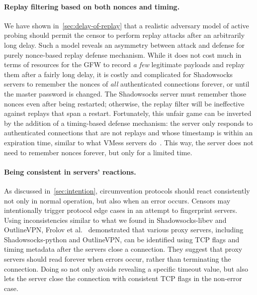 \documentclass[sigconf,letterpaper]{acmart}
\begin{document}
\paragraph{Replay filtering based on both nonces and timing.}
We have shown in~\autoref{sec:delay-of-replay}
that a realistic adversary model of active probing should permit
the censor to perform replay attacks after an arbitrarily long delay.
Such a model reveals an asymmetry between attack and defense
for purely nonce-based replay defense mechanism.
While it does not cost much in terms of resources for the GFW to record \emph{a few} legitimate payloads and replay them after a fairly long delay,
it is costly and complicated for Shadowsocks servers to remember the nonces of \emph{all} authenticated connections forever,
or until the master password is changed.
The Shadowsocks server must remember those nonces even after being restarted;
otherwise, the replay filter will be ineffective against replays that span a restart.
Fortunately,
this unfair game can be inverted by the addition of a timing-based defense mechanism:
the server only responds to authenticated connections that are not replays
and whose timestamp is within an expiration time,
similar to what VMess servers do~\cite{v2ray-replay-summary}.
This way,
the server does not need to remember nonces forever,
but only for a limited time.


\paragraph{Being consistent in servers' reactions.}

As discussed in~\autoref{sec:intention},
circumvention protocols should react consistently not only in normal operation,
but also when an error occurs.
Censors may intentionally trigger protocol edge cases in an attempt to fingerprint servers.
Using inconsistencies similar to what we found in Shadowsocks-libev and OutlineVPN,
Frolov et al.~\cite{Frolov2020a} demonstrated that various proxy servers,
including Shadowsocks-python and OutlineVPN,
can be identified using TCP flags and timing metadata after the servers close a connection.
They suggest that proxy servers should read forever when errors occur,
rather than terminating the connection.
Doing so not only avoids revealing a specific timeout value,
but also lets the server close the connection with consistent TCP flags in the non-error case.
\end{document}

